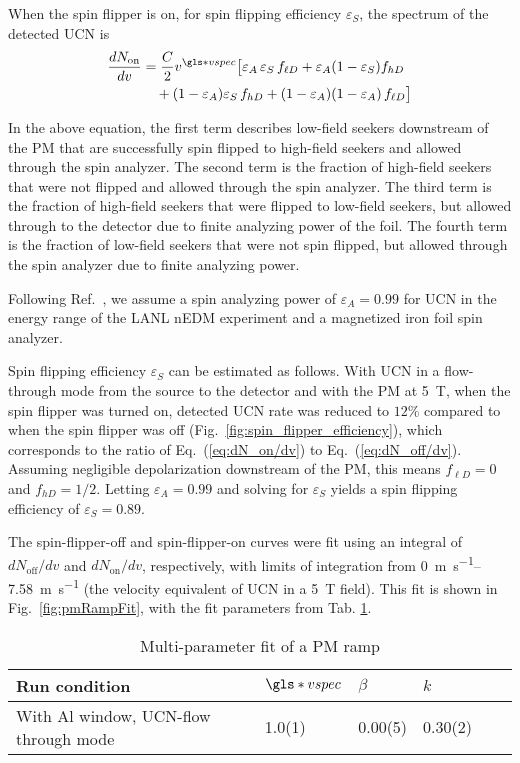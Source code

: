 When the spin flipper is on, for spin flipping efficiency $\varepsilon_S$, the spectrum of the detected UCN is
%
\begin{align}
    \frac{dN_\text{on}}{dv} &= \frac{C}{2} v^{\gls*{vspec}} \big[ \varepsilon_A\,\varepsilon_S\, f_{\ell D} + \varepsilon_A(1 - \varepsilon_S) f_{h D} \nonumber \\
    &\quad + (1 - \varepsilon_A)\varepsilon_S\,f_{h D}  + (1 - \varepsilon_A)(1-\varepsilon_A)\,f_{\ell D} \big]\label{eq:dN_on/dv}
\end{align}

In the above equation, the first term describes low-field seekers downstream of the PM that are successfully spin flipped to high-field seekers and allowed through the spin analyzer. The second term is the fraction of high-field seekers that were not flipped and allowed through the spin analyzer. The third term is the fraction of high-field seekers that were flipped to low-field seekers, but allowed through to the detector due to finite analyzing power of the foil. The fourth term is the fraction of low-field seekers that were not spin flipped, but allowed through the spin analyzer due to finite analyzing power.

Following Ref.~\cite{ThorstenThesis}, we assume a spin analyzing power of $\varepsilon_A=0.99$ for UCN in the energy range of the LANL nEDM experiment and a magnetized iron foil spin analyzer.

Spin flipping efficiency $\varepsilon_S$ can be estimated as follows. With UCN in a flow-through mode from the source to the detector and with the PM at \qty{5}{\tesla}, when the spin flipper was turned on, detected UCN rate was reduced to $12\%$ compared to when the spin flipper was off (Fig.~\ref{fig:spin_flipper_efficiency}), which corresponds to the ratio of Eq.~(\ref{eq:dN_on/dv}) to Eq.~(\ref{eq:dN_off/dv}). Assuming negligible depolarization downstream of the PM, this means $f_{\ell D} = 0$ and $f_{hD} = 1/2$. Letting $\varepsilon_A=0.99$ and solving for $\varepsilon_S$ yields a spin flipping efficiency of $\varepsilon_S=0.89$.

The spin-flipper-off and spin-flipper-on curves were fit using an integral of $dN_\text{off}/dv$ and $dN_\text{on}/dv$, respectively, with limits of integration from \qtyrange{0}{7.58}{\meter\per\s} (the velocity equivalent of UCN in a \qty{5}{\tesla} field). This fit is shown in Fig.~\ref{fig:pmRampFit}, with the fit parameters from Tab. \ref{tb:pmRampFit}. 


\begin{table}
\centering
\caption{\label{tb:pmRampFit}Multi-parameter fit of a PM ramp}
\begin{tabular}{llllll}
\toprule
\multicolumn{1}{l}{Run condition} & \multicolumn{1}{l}{$\gls*{vspec}$} & \multicolumn{1}{l}{$\beta$} & \multicolumn{1}{l}{$k$} \\ 
\midrule
With Al window, UCN-flow through mode           & 1.0(1)      & 0.00(5)                 & 0.30(2)   \\
\bottomrule
\end{tabular}
\end{table}


